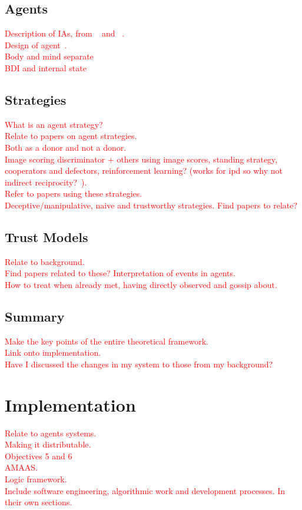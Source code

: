 \documentclass[]{final_report}
\begin{document}
\subsection{Agents}
\textcolor{red}{Description of IAs, from ~\cite{wooldridge_jennings_1995} and ~\cite{russell2016artificial}.\\
Design of agent~\cite{prosocs}.\\
Body and mind separate\\
BDI and internal state}

\subsection{Strategies}
\label{subs:strat}
\textcolor{red}{What is an agent strategy?\\
Relate to papers on agent strategies.\\
Both as a donor and not a donor.\\
Image scoring discriminator + others using image scores, standing strategy, cooperators and defectors, reinforcement learning? (works for ipd so why not indirect reciprocity?~\cite{harper2017reinforcement}).\\
Refer to papers using these strategies.\\
Deceptive/manipulative, naive and trustworthy strategies. Find papers to relate?}

\subsection{Trust Models}
\textcolor{red}{Relate to background.\\
Find papers related to these? Interpretation of events in agents.\\
How to treat when already met, having directly observed and gossip about.}

\subsection{Summary}
\textcolor{red}{Make the key points of the entire theoretical framework.\\
Link onto implementation.\\
Have I discussed the changes in my system to those from my background?}


\section{Implementation}
\textcolor{red}{Relate to agents systems.\\
Making it distributable.\\
Objectives 5 and 6\\
AMAAS.\\
Logic framework.\\
Include software engineering, algorithmic work and development processes. In their own sections.\\}
\end{document}
